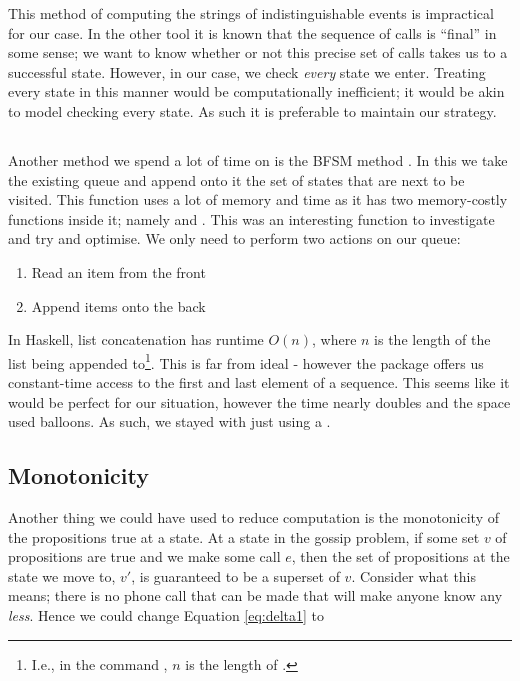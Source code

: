\documentclass[ %
                    author={Leo Poulson},
                supervisor={Dr. Steven Ramsay},
                    degree={BSc},
                     title={Epistemic Planning for the Dynamic Gossip problem},
                  subtitle={},
                      year={2019} ]{dissertation}
\begin{document}
This method of computing the strings of indistinguishable events is impractical
for our case. In the other tool it is known that the sequence of calls is
``final'' in some sense; we want to know whether or not this precise set of
calls takes us to a successful state. However, in our case, we check
\emph{every} state we enter. Treating every state in this manner would be
computationally inefficient; it would be akin to model checking every state. As
such it is preferable to maintain our strategy.  

\subsection{}

Another method we spend a lot of time on is the BFSM method . In
this we take the existing queue and append onto it the set of states that are
next to be visited. This function uses a lot of memory and time as it has two
memory-costly functions inside it; namely  and \mih{(++)}.
This was an interesting function to investigate and try and optimise. We only
need to perform two actions on our queue:

\begin{enumerate}
\item Read an item from the front
\item Append items onto the back
\end{enumerate}

In Haskell, list concatenation has runtime $O(n)$, where $n$ is the length of
the list being appended to\footnote{I.e., in the command , $n$ is
  the length of .}. This is far from ideal - however the 
package offers us constant-time access to the first and last element of a
sequence. This seems like it would be perfect for our situation, however the
time nearly doubles and the space used balloons. As such, we stayed with just
using a .

\subsection{Monotonicity}
\label{sec:Monotonicity}

Another thing we could have used to reduce computation is the monotonicity of
the propositions true at a state. At a state in the gossip problem, if some set
$v$ of propositions are true and we make some call $e$, then the set of
propositions at the state we move to, $v'$, is guaranteed to be a superset of
$v$. Consider what this means; there is no phone call that can be made that will
make anyone know any \emph{less}. Hence we could change Equation
\ref{eq:delta1} to
\end{document}
